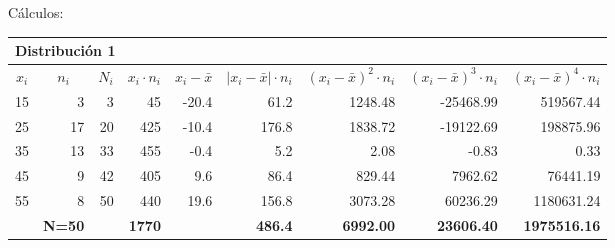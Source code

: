 Cálculos:


\begin{table}[H]
\tiny
\centering
\begin{tabular}{rrrrrrrrr}
\multicolumn{8}{l}{\textbf{Distribución 1}} & \multicolumn{1}{l}{\textbf{}} \\ \hline
\multicolumn{1}{|c|}{\textbf{$x_i$}} & \multicolumn{1}{c|}{\textbf{$n_i$}} & \multicolumn{1}{c|}{\textbf{$N_i$}} & \multicolumn{1}{c|}{\textbf{$x_i \cdot n_i$}} & \multicolumn{1}{c|}{\textbf{$x_i-\bar x$}} & \multicolumn{1}{c|}{\textbf{$|x_i-\bar x|\cdot n_i$}} & \multicolumn{1}{c|}{\textbf{$(x_i-\bar x)^2\cdot n_i$}} & \multicolumn{1}{c|}{\textbf{$(x_i-\bar x)^3\cdot n_i$}} & \multicolumn{1}{c|}{\textbf{$(x_i-\bar x)^4\cdot n_i$}} \\ \hline
\multicolumn{1}{|r|}{15} & \multicolumn{1}{r|}{3} & \multicolumn{1}{r|}{3} & \multicolumn{1}{r|}{45} & \multicolumn{1}{r|}{-20.4} & \multicolumn{1}{r|}{61.2} & \multicolumn{1}{r|}{1248.48} & \multicolumn{1}{r|}{-25468.99} & \multicolumn{1}{r|}{519567.44} \\ \hline
\multicolumn{1}{|r|}{25} & \multicolumn{1}{r|}{17} & \multicolumn{1}{r|}{20} & \multicolumn{1}{r|}{425} & \multicolumn{1}{r|}{-10.4} & \multicolumn{1}{r|}{176.8} & \multicolumn{1}{r|}{1838.72} & \multicolumn{1}{r|}{-19122.69} & \multicolumn{1}{r|}{198875.96} \\ \hline
\multicolumn{1}{|r|}{35} & \multicolumn{1}{r|}{13} & \multicolumn{1}{r|}{33} & \multicolumn{1}{r|}{455} & \multicolumn{1}{r|}{-0.4} & \multicolumn{1}{r|}{5.2} & \multicolumn{1}{r|}{2.08} & \multicolumn{1}{r|}{-0.83} & \multicolumn{1}{r|}{0.33} \\ \hline
\multicolumn{1}{|r|}{45} & \multicolumn{1}{r|}{9} & \multicolumn{1}{r|}{42} & \multicolumn{1}{r|}{405} & \multicolumn{1}{r|}{9.6} & \multicolumn{1}{r|}{86.4} & \multicolumn{1}{r|}{829.44} & \multicolumn{1}{r|}{7962.62} & \multicolumn{1}{r|}{76441.19} \\ \hline
\multicolumn{1}{|r|}{55} & \multicolumn{1}{r|}{8} & \multicolumn{1}{r|}{50} & \multicolumn{1}{r|}{440} & \multicolumn{1}{r|}{19.6} & \multicolumn{1}{r|}{156.8} & \multicolumn{1}{r|}{3073.28} & \multicolumn{1}{r|}{60236.29} & \multicolumn{1}{r|}{1180631.24} \\ \hline
\multicolumn{1}{r|}{\textbf{}} & \multicolumn{1}{r|}{\textbf{N=50}} & \multicolumn{1}{r|}{\textbf{}} & \multicolumn{1}{r|}{\textbf{1770}} & \multicolumn{1}{r|}{\textbf{}} & \multicolumn{1}{r|}{\textbf{486.4}} & \multicolumn{1}{r|}{\textbf{6992.00}} & \multicolumn{1}{r|}{\textbf{23606.40}} & \multicolumn{1}{r|}{\textbf{1975516.16}} \\ \cline{2-2} \cline{4-4} \cline{6-9} 
\end{tabular}
\end{table}

